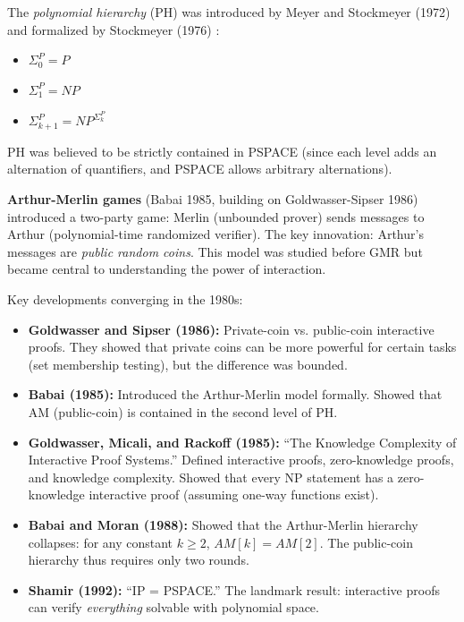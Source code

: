 The \emph{polynomial hierarchy} (PH) was introduced by Meyer and Stockmeyer (1972) and formalized by Stockmeyer (1976) \cite{Stockmeyer1976}:
\begin{itemize}
\item $\Sigma_0^P = P$
\item $\Sigma_1^P = NP$
\item $\Sigma_{k+1}^P = NP^{\Sigma_k^P}$
\end{itemize}
PH was believed to be strictly contained in PSPACE (since each level adds an alternation of quantifiers, and PSPACE allows arbitrary alternations).

\textbf{Arthur-Merlin games} (Babai 1985, building on Goldwasser-Sipser 1986) introduced a two-party game: Merlin (unbounded prover) sends messages to Arthur (polynomial-time randomized verifier). The key innovation: Arthur's messages are \emph{public random coins}. This model was studied before GMR but became central to understanding the power of interaction.

Key developments converging in the 1980s:

\begin{itemize}
\item \textbf{Goldwasser and Sipser (1986):} Private-coin vs. public-coin interactive proofs. They showed that private coins can be more powerful for certain tasks (set membership testing), but the difference was bounded.

\item \textbf{Babai (1985):} Introduced the Arthur-Merlin model formally. Showed that AM (public-coin) is contained in the second level of PH.

\item \textbf{Goldwasser, Micali, and Rackoff (1985):} ``The Knowledge Complexity of Interactive Proof Systems.'' Defined interactive proofs, zero-knowledge proofs, and knowledge complexity. Showed that every NP statement has a zero-knowledge interactive proof (assuming one-way functions exist).

\item \textbf{Babai and Moran (1988):} Showed that the Arthur-Merlin hierarchy collapses: for any constant $k \ge 2$, $AM[k] = AM[2]$. The public-coin hierarchy thus requires only two rounds.

\item \textbf{Shamir (1992):} ``IP = PSPACE.'' The landmark result: interactive proofs can verify \emph{everything} solvable with polynomial space.
\end{itemize}

